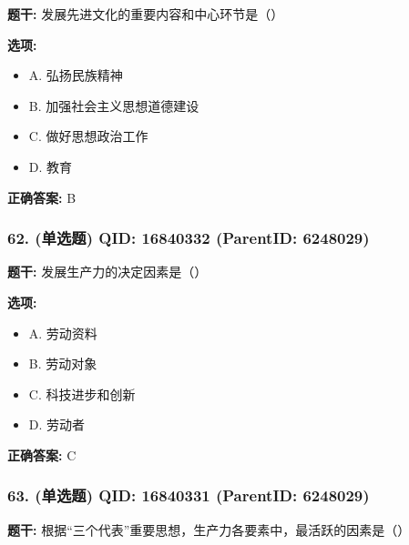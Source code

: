 \documentclass[12pt,UTF8]{ctexart}
\begin{document}
\textbf{题干:}
发展先进文化的重要内容和中心环节是（）



\textbf{选项:}
\begin{itemize}[leftmargin=*]

  \item A. 弘扬民族精神

  \item B. 加强社会主义思想道德建设

  \item C. 做好思想政治工作

  \item D. 教育

\end{itemize}

\textbf{正确答案:}
B

\vspace{0.3em}\hrulefill\vspace{0.7em}

\subsubsection*{62. (单选题) \small QID: 16840332 (ParentID: 6248029)}

\textbf{题干:}
发展生产力的决定因素是（）



\textbf{选项:}
\begin{itemize}[leftmargin=*]

  \item A. 劳动资料

  \item B. 劳动对象

  \item C. 科技进步和创新

  \item D. 劳动者

\end{itemize}

\textbf{正确答案:}
C

\vspace{0.3em}\hrulefill\vspace{0.7em}

\subsubsection*{63. (单选题) \small QID: 16840331 (ParentID: 6248029)}

\textbf{题干:}
根据“三个代表”重要思想，生产力各要素中，最活跃的因素是（）
\end{document}
